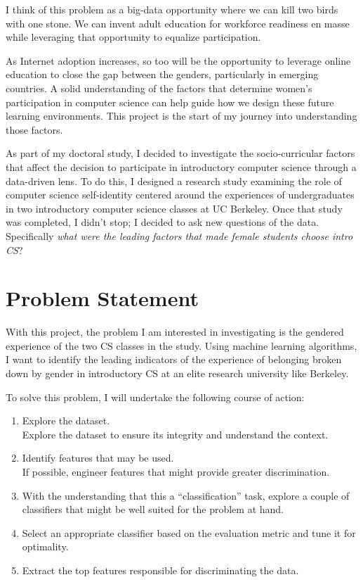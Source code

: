 I think of this problem as a big-data opportunity where we can kill two birds with one stone. We can invent adult education for workforce readiness en masse while leveraging that opportunity to equalize participation.

As Internet adoption increases, so too will be the opportunity to leverage online education to close the gap between the genders, particularly in emerging countries. A solid understanding of the factors that determine women's participation in computer science can help guide how we design these future learning environments.  This project is the start of my journey into understanding those factors.

As part of my doctoral study, I decided to investigate the socio-curricular factors that affect the decision to participate in introductory computer science through a data-driven lens. To do this, I designed a research study examining the role of computer science self-identity centered around the experiences of undergraduates in two introductory computer science classes at UC Berkeley. Once that study was completed, I didn't stop; I decided to ask new questions of the data. Specifically \textit{what were the leading factors that made female students choose intro CS}?


\section*{Problem Statement}

With this project, the problem I am interested in investigating is the gendered experience of the two CS classes in the study. Using machine learning algorithms, I want to identify the leading indicators of the experience of belonging broken down by gender in introductory CS at an elite research university like Berkeley.

To solve this problem, I will undertake the following course of action:
\begin{enumerate}%
\item Explore the dataset.\\
Explore the dataset to ensure its integrity and understand the context.
\item Identify features that may be used.\\ 
If possible, engineer features that might provide greater discrimination.
\item With the understanding that this a ``classification'' task, explore a couple of classifiers that might be well suited for the problem at hand.
\item Select an appropriate classifier based on the evaluation metric and tune it for optimality.
\item Extract the top features responsible for discriminating the data.
\end{enumerate}

